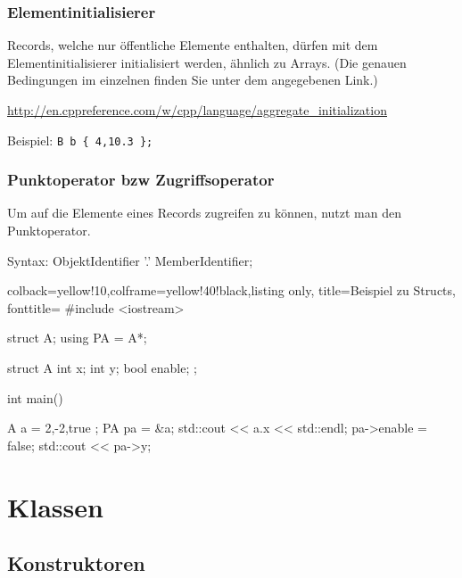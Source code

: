 \documentclass[a4paper]{report}
\begin{document}
\subsubsection{Elementinitialisierer}

Records, welche nur öffentliche Elemente enthalten, dürfen mit dem Elementinitialisierer initialisiert werden, ähnlich zu Arrays. (Die genauen Bedingungen im einzelnen finden Sie unter dem angegebenen Link.)

\url{http://en.cppreference.com/w/cpp/language/aggregate_initialization}

Beispiel: \quad \texttt{B b \{ 4,10.3 \};}

\subsubsection{Punktoperator bzw Zugriffsoperator}

Um auf die Elemente eines Records zugreifen zu können, nutzt man den Punktoperator.

\begin{rail}
	Syntax:
	ObjektIdentifier '.' MemberIdentifier;
\end{rail}

\begin{tcblisting}{colback=yellow!10,colframe=yellow!40!black,listing only,
		title=Beispiel zu Structs, fonttitle=\bfseries}
	#include <iostream>
	
	struct A;
	using PA = A*;
	
	struct A {
		int x;
		int y;
		bool enable;
	};
	
	int main(){
	
	A a = { 2,-2,true };
	PA pa = &a;
	std::cout << a.x << std::endl;
	pa->enable = false;
	std::cout << pa->y;
	
	}
\end{tcblisting}



\section{Klassen}

\subsection{Konstruktoren}
\end{document}
